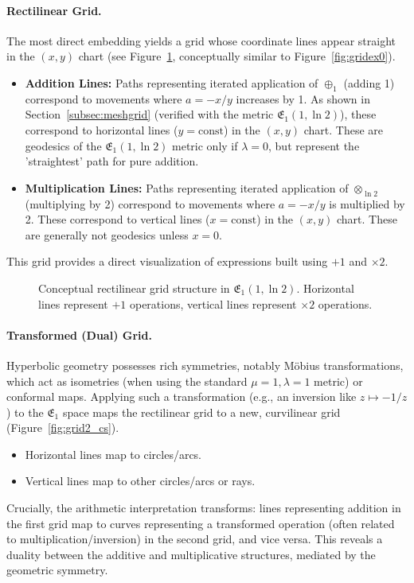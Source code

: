 \documentclass[12pt]{article}
\begin{document}
\paragraph{Rectilinear Grid.} The most direct embedding yields a grid whose coordinate lines appear straight in the \( (x, y) \) chart (see Figure~\ref{fig:grid1_cs}, conceptually similar to Figure~\ref{fig:gridex0}).
\begin{itemize}
    \item \textbf{Addition Lines:} Paths representing iterated application of \( \oplus_1 \) (adding 1) correspond to movements where \( a = -x/y \) increases by 1. As shown in Section~\ref{subsec:meshgrid} %
      (verified with the metric \( \mathfrak{E}_1(1, \ln 2) \)), these correspond to horizontal lines (\( y = \text{const} \)) in the \( (x, y) \) chart. These are geodesics of the \( \mathfrak{E}_1(1, \ln 2) \) metric only if \( \lambda=0 \), but represent the 'straightest' path for pure addition.
    \item \textbf{Multiplication Lines:} Paths representing iterated application of \( \otimes_{\ln 2} \) (multiplying by 2) correspond to movements where \( a = -x/y \) is multiplied by 2. These correspond to vertical lines (\( x = \text{const} \)) in the \( (x, y) \) chart. These are generally not geodesics unless \( x=0 \).
\end{itemize}
This grid provides a direct visualization of expressions built using \( +1 \) and \( \times 2 \).

\begin{figure}[ht]
\centering
\caption{Conceptual rectilinear grid structure in \( \mathfrak{E}_1(1, \ln 2) \). Horizontal lines represent \(+1\) operations, vertical lines represent \(\times 2\) operations.}
\label{fig:grid1_cs}
\end{figure}

\paragraph{Transformed (Dual) Grid.} Hyperbolic geometry possesses rich symmetries, notably Möbius transformations, which act as isometries (when using the standard \( \mu=1, \lambda=1 \) metric) or conformal maps. Applying such a transformation (e.g., an inversion like \( z \mapsto -1/z \)) to the \( \mathfrak{E}_1 \) space maps the rectilinear grid to a new, curvilinear grid (Figure~\ref{fig:grid2_cs}).
\begin{itemize}
    \item Horizontal lines map to circles/arcs.
    \item Vertical lines map to other circles/arcs or rays.
\end{itemize}
Crucially, the arithmetic interpretation transforms: lines representing addition in the first grid map to curves representing a transformed operation (often related to multiplication/inversion) in the second grid, and vice versa. This reveals a duality between the additive and multiplicative structures, mediated by the geometric symmetry.
\end{document}
